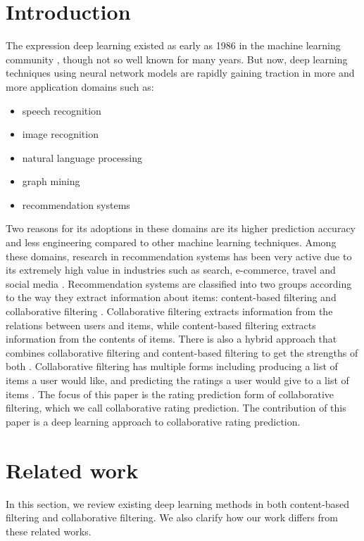 \documentclass[letterpaper]{article}
\begin{document}
\section{Introduction}
The expression deep learning existed as early as 1986 in the machine learning 
community \cite{dechter1986learning}, though not so well known for many 
years.
But now, deep learning techniques using neural network models are rapidly 
gaining traction in more and more application domains such as:
\begin{itemize}
	\item speech recognition \cite{hannun2014deep}
	\item image recognition \cite{simonyan2014very}
	\item natural language processing \cite{yao2013recurrent}
	\item graph mining \cite{grovernode2vec}
	\item recommendation systems \cite{barkan2016item2vec}
\end{itemize}
Two reasons for its adoptions in these domains are its higher prediction 
accuracy and less engineering compared to other machine learning techniques.
Among these domains, research in recommendation systems has been very active  
due to its extremely high value in industries such as search, e-commerce, 
travel and social media \cite{buettner2016predicting}.
Recommendation systems are classified into two groups according to the way they 
extract information about items: content-based filtering and collaborative 
filtering \cite{ricci2011introduction}.
Collaborative filtering extracts information from the relations between users 
and items, while content-based filtering extracts information from the contents 
of items.
There is also a hybrid approach that combines collaborative filtering and 
content-based filtering to get the strengths of both 
\cite{adomavicius2005toward}.
Collaborative filtering has multiple forms including producing a list of items 
a user would like, and predicting the ratings a user would give to a list of 
items \cite{su2009survey}.
The focus of this paper is the rating prediction form of collaborative 
filtering, which we call collaborative rating prediction.
The contribution of this paper is a deep learning approach to collaborative 
rating prediction.

\section{Related work}
In this section,
we review existing deep learning methods in both content-based 
filtering and collaborative filtering.
We also clarify how our work differs from these related works.
\end{document}
